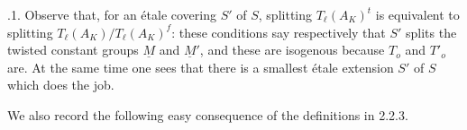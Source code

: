 \medskip
{}.1. Observe that, for an \'{e}tale covering $S'$ of $S$, splitting
$T_\ell(A_K)^t$ is equivalent to splitting
$T_\ell(A_K)/T_\ell(A_K)^f$: these conditions say respectively that
$S'$ splits the twisted constant groups $\underline M$ and
$\underline M'$, and these are isogenous because $T_o$ and $T'_o$
are. At the same time one sees that there is a smallest \'{e}tale
extension $S'$ of $S$ which does the job.

We also record the following easy consequence of the definitions in
2.2.3.
